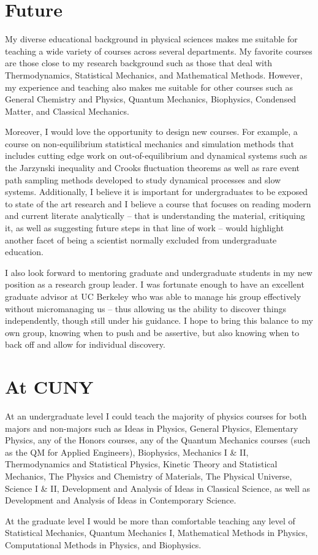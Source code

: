 \documentclass[11pt]{article}
\begin{document}
\section{Future} %

My diverse educational background in physical sciences makes me suitable for teaching a wide variety of courses across several departments.  My favorite courses are those close to my research background such as those that deal with Thermodynamics, Statistical Mechanics, and Mathematical Methods.  However, my experience and teaching also makes me suitable for other courses such as General Chemistry and Physics, Quantum Mechanics, Biophysics, Condensed Matter, and Classical Mechanics.

Moreover, I would love the opportunity to design new courses.  For example, a course on non-equilibrium statistical mechanics and simulation methods that includes cutting edge work on out-of-equilibrium and dynamical systems such as the Jarzynski inequality and Crooks fluctuation theorems as well as rare event path sampling methods developed to study dynamical processes and slow systems.  Additionally, I believe it is important for undergraduates to be exposed to state of the art research and I believe a course that focuses on reading modern and current literate analytically -- that is understanding the material, critiquing it, as well as suggesting future steps in that line of work -- would highlight another facet of being a scientist normally excluded from undergraduate education.

I also look forward to mentoring graduate and undergraduate students in my new position as a research group leader.  I was fortunate enough to have an excellent graduate advisor at UC Berkeley who was able to manage his group effectively without micromanaging us -- thus allowing us the ability to discover things independently, though still under his guidance.  I hope to bring this balance to my own group, knowing when to push and be assertive, but also knowing when to back off and allow for individual discovery.

\section{At CUNY} %

At an undergraduate level I could teach the majority of physics courses for both majors and non-majors such as Ideas in Physics, General Physics, Elementary Physics, any of the Honors courses, any of the Quantum Mechanics courses (such as the QM for Applied Engineers), Biophysics, Mechanics I \& II, Thermodynamics and Statistical Physics, Kinetic Theory and Statistical Mechanics, The Physics and Chemistry of Materials, The Physical Universe, Science I \& II, Development and Analysis of Ideas in Classical Science, as well as Development and Analysis of Ideas in Contemporary Science.

At the graduate level I would be more than comfortable teaching any level of Statistical Mechanics, Quantum Mechanics I, Mathematical Methods in Physics, Computational Methods in Physics, and Biophysics.
\end{document}
